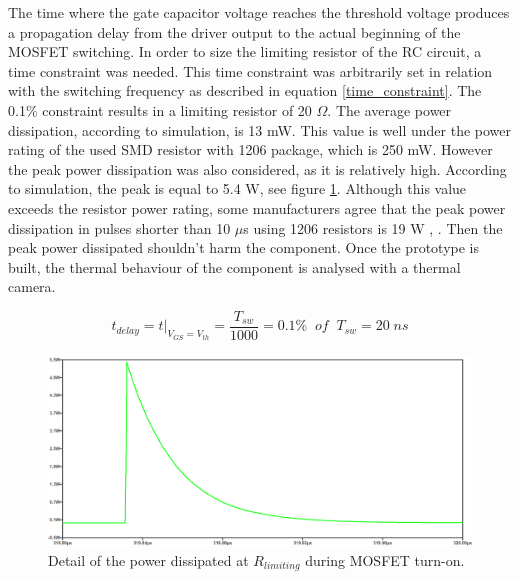 The time where the gate capacitor voltage reaches the threshold voltage produces a propagation delay from the driver output to the actual beginning of the MOSFET switching. In order to size the limiting resistor of the RC circuit, a time constraint was needed. This time constraint was arbitrarily set in relation with the switching frequency as described in equation \ref{time_constraint}. The 0.1\% constraint results in a limiting resistor of 20 $\Omega$. The average power dissipation, according to simulation, is 13 mW. This value is well under the power rating of the used SMD resistor with 1206 package, which is 250 mW. However the peak power dissipation was also considered, as it is relatively high. According to simulation, the peak is equal to 5.4 W, see figure \ref{gate_resistor_power_dissipation}. Although this value exceeds the resistor power rating, some manufacturers agree that the peak power dissipation in pulses shorter than 10 $\mu$s using 1206 resistors is 19 W \cite{pulse_withstanding_chip_resistors}, \cite{gate_driver_design_infineon}. Then the peak power dissipated shouldn't harm the component. Once the prototype is built, the thermal behaviour of the component is analysed with a thermal camera.

\begin{equation} \label{time_constraint}
t_{delay} = t\big\rvert_{V_{GS} = V_{th}} =\frac{T_{sw}}{1000} = 0.1 \% \;\; of \;\; T_{sw} = 20 \; ns
\end{equation}


\begin{figure}[H]
	\begin{center}
		\includegraphics[width=\textwidth]{../Pictures/P1/Component_sizing/Gate_resistor_power_dissipation.png}
		\caption{Detail of the power dissipated at $R_{limiting}$ during MOSFET turn-on.}
		\label{gate_resistor_power_dissipation}
	\end{center}	
\end{figure}


